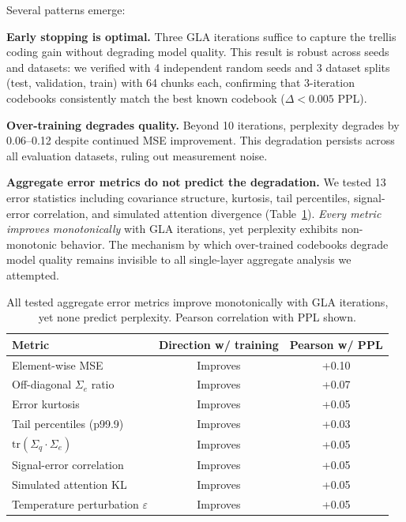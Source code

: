 \documentclass{article}
\begin{document}
Several patterns emerge:

\textbf{Early stopping is optimal.} Three GLA iterations suffice to capture
the trellis coding gain without degrading model quality. This result is robust
across seeds and datasets: we verified with 4 independent random seeds and 3
dataset splits (test, validation, train) with 64 chunks each, confirming that
3-iteration codebooks consistently match the best known codebook
($\Delta < 0.005$ PPL).

\textbf{Over-training degrades quality.} Beyond 10 iterations, perplexity
degrades by 0.06--0.12 despite continued MSE improvement. This degradation
persists across all evaluation datasets, ruling out measurement noise.

\textbf{Aggregate error metrics do not predict the degradation.} We tested 13
error statistics including covariance structure, kurtosis, tail percentiles,
signal-error correlation, and simulated attention divergence
(Table~\ref{tab:metrics_monotonic}). \emph{Every metric improves monotonically}
with GLA iterations, yet perplexity exhibits non-monotonic behavior. The
mechanism by which over-trained codebooks degrade model quality remains invisible
to all single-layer aggregate analysis we attempted.

\begin{table}[t]
\centering
\caption{All tested aggregate error metrics improve monotonically with GLA
  iterations, yet none predict perplexity. Pearson correlation with PPL shown.}
\label{tab:metrics_monotonic}
\begin{tabular}{@{}lcc@{}}
\toprule
Metric & Direction w/ training & Pearson w/ PPL \\
\midrule
Element-wise MSE & Improves & +0.10 \\
Off-diagonal $\Sigma_e$ ratio & Improves & +0.07 \\
Error kurtosis & Improves & +0.05 \\
Tail percentiles (p99.9) & Improves & +0.03 \\
$\mathrm{tr}(\Sigma_q \cdot \Sigma_e)$ & Improves & +0.05 \\
Signal-error correlation & Improves & +0.05 \\
Simulated attention KL & Improves & +0.05 \\
Temperature perturbation $\varepsilon$ & Improves & +0.05 \\
\bottomrule
\end{tabular}
\end{table}
\end{document}
